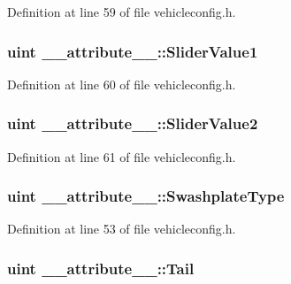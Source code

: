 \-Definition at line 59 of file vehicleconfig.\-h.

\hypertarget{group___config_plugin_gab1ae7499273b5e51087ce2da94c0acab}{
\subsubsection[{\-Slider\-Value1}]{\setlength{\rightskip}{0pt plus 5cm}uint {\bf \-\_\-\-\_\-attribute\-\_\-\-\_\-\-::\-Slider\-Value1}}}\label{group___config_plugin_gab1ae7499273b5e51087ce2da94c0acab}


\-Definition at line 60 of file vehicleconfig.\-h.

\hypertarget{group___config_plugin_ga86cc56b0247155cf5d5ef0e31d509fed}{
\subsubsection[{\-Slider\-Value2}]{\setlength{\rightskip}{0pt plus 5cm}uint {\bf \-\_\-\-\_\-attribute\-\_\-\-\_\-\-::\-Slider\-Value2}}}\label{group___config_plugin_ga86cc56b0247155cf5d5ef0e31d509fed}


\-Definition at line 61 of file vehicleconfig.\-h.

\hypertarget{group___config_plugin_ga4f96550cdd283e7bb8b8fb7ec7d3cc09}{
\subsubsection[{\-Swashplate\-Type}]{\setlength{\rightskip}{0pt plus 5cm}uint {\bf \-\_\-\-\_\-attribute\-\_\-\-\_\-\-::\-Swashplate\-Type}}}\label{group___config_plugin_ga4f96550cdd283e7bb8b8fb7ec7d3cc09}


\-Definition at line 53 of file vehicleconfig.\-h.

\hypertarget{group___config_plugin_ga904a0b19b372c87ddf027435cd9e7723}{
\subsubsection[{\-Tail}]{\setlength{\rightskip}{0pt plus 5cm}uint {\bf \-\_\-\-\_\-attribute\-\_\-\-\_\-\-::\-Tail}}}\label{group___config_plugin_ga904a0b19b372c87ddf027435cd9e7723}


